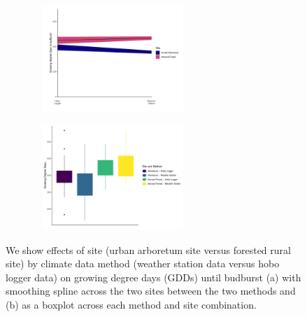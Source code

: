 \documentclass{article}\usepackage[]{graphicx}\usepackage[]{color}
\begin{document}
\begin{enumerate}
\begin{figure}[H]
  \begin{subfigure}{.5\textwidth}
    \caption{}
    \centering
    \includegraphics[height=4cm, width=6cm]{..//analyses/figures/gdd_comparemethodsandsites.pdf}
    \label{fig:sitemethod}
  \end{subfigure}%
    \begin{subfigure}{.5\textwidth}
      \caption{}
      \centering
      \includegraphics[height=4cm, width=6cm]{..//analyses/figures/gdd_comparemethodsandsites_boxplot.pdf}
    \label{fig:boxplot}
  \end{subfigure}
\caption{ We show effects of site (urban arboretum site versus forested rural site) by climate data method (weather station data versus hobo logger data) on growing degree days (GDDs) until budburst (a) with smoothing spline across the two sites between the two methods and (b) as a boxplot across each method and site combination.}
\label{fig:interaction}
\end{figure}



\end{enumerate}
\end{document}
